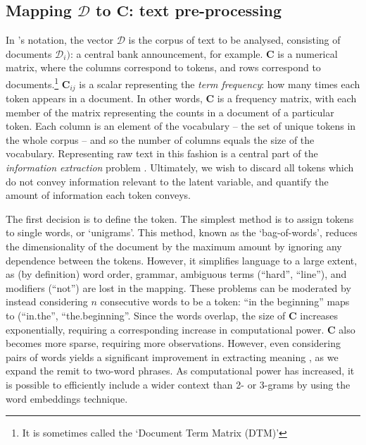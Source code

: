\documentclass{article}
\begin{document}
\subsection{Mapping \(\mathcal{D}\) to \(\mathbf{C}\): text pre-processing}\label{preprocess}
In \textcite{gentzkowTextData2019}'s notation, the vector \(\mathcal{D}\) is the corpus of text to be analysed, consisting of documents \(\mathcal{D}_i)\): a central bank announcement, for example. \(\mathbf{C}\) is a numerical matrix, where the columns correspond to tokens, and rows correspond to documents.\footnote{It is sometimes called the `Document Term Matrix (DTM)'} \(\mathbf{C}_{ij}\) is a scalar representing the \textit{term frequency}: how many times each token appears in a document. In other words, \(\mathbf{C}\) is a frequency matrix, with each member of the matrix representing the counts in a document of a particular token. Each column is an element of the vocabulary -- the set of unique tokens in the whole corpus -- and so the number of columns equals the size of the vocabulary. Representing raw text in this fashion is a central part of the \textit{information extraction} problem \parencite[529]{manningFoundationsStatisticalNatural1999}. Ultimately, we wish to discard all tokens which do not convey information relevant to the latent variable, and quantify the amount of information each token conveys.

The first decision is to define the token. The simplest method is to assign tokens to single words, or `unigrams'. This method, known as the `bag-of-words', reduces the dimensionality of the document by the maximum amount by ignoring any dependence between the tokens. However, it simplifies language to a large extent, as (by definition) word order, grammar, ambiguous terms (``hard'', ``line''), and modifiers (``not'') are lost in the mapping. These problems can be moderated by instead considering \(n\) consecutive words to be a token: ``in the beginning'' maps to (``in.the'', ``the.beginning''. Since the words overlap, the size of \(\mathbf{C}\) increases exponentially, requiring a corresponding increase in computational power. \(\mathbf{C}\) also becomes more sparse, requiring more observations. However, even considering pairs of words yields a significant improvement in extracting meaning \parencite{chengNgramSkipgramConcgram2006}, as we expand the remit to two-word phrases. As computational power has increased, it is possible to efficiently include a wider context than 2- or 3-grams by using the word embeddings technique.
\end{document}

